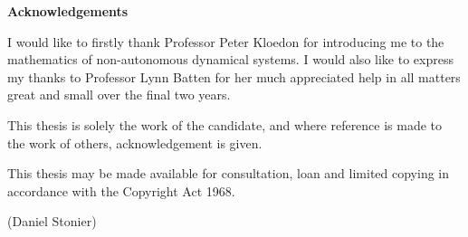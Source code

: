 
\hspace{2cm} \newpage

\vspace{3cm}

\begin{center}
\large
\textbf{Acknowledgements}
\end{center}
\normalsize

I would like to firstly thank Professor Peter Kloedon for introducing me to the
mathematics of non-autonomous dynamical systems. I would also like to express my
thanks to Professor Lynn Batten for her much appreciated help in all matters
great and small over the final two years.



\vspace{12cm}\small
This thesis is solely the work of the candidate, and where reference is made to
the work of others, acknowledgement is given.

This thesis may be made available for consultation, loan and limited copying in
accordance with the Copyright Act 1968.

\vspace{1.5cm}
\hspace{9cm} (Daniel Stonier)
\normalsize

\endinput
